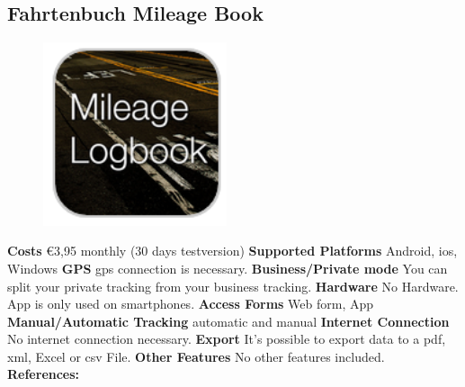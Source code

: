 \begin{singlespace}
\section{Fahrtenbuch Mileage Book}
\begin{figure}
  \begin{center}
    \includegraphics[width=0.48\textwidth]{bilder/mileage}
  \end{center}
\end{figure}
\textbf{Costs} \euro 3,95 monthly (30 days testversion)
\newline\newline
\textbf{Supported Platforms} Android, \gls{ios}, Windows
\newline\newline
\textbf{GPS} \gls{gps} connection is necessary.
\newline\newline
\textbf{Business/Private mode} You can split your private tracking from your business tracking.
\newline\newline
\textbf{Hardware} No Hardware. App is only used on smartphones.
\newline\newline
\textbf{Access Forms} Web form, App
\newline\newline
\textbf{Manual/Automatic Tracking} automatic and manual
\newline\newline
\textbf{Internet Connection} No internet connection necessary.
\newline\newline
\textbf{Export} It’s possible to export data to a \gls{pdf}, \gls{xml}, Excel or \gls{csv} File.
\newline\newline
\textbf{Other Features} No other features included.
\newline\newline
\textbf{References:} \cite{Fahrtenbuch_Mileage_Book}
\newpage
\clearpageauthor

\end{singlespace}
